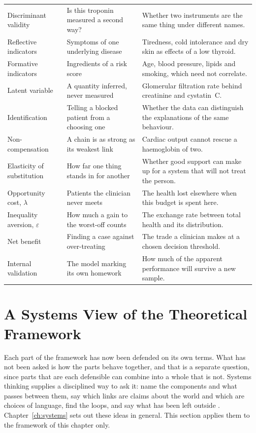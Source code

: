 {\begin{longtable}{p{3.3cm} p{3.9cm} p{6.2cm}}
\addlinespace
Discriminant validity & Is this troponin measured a second way? & Whether two instruments are the same thing under different names. \\
\addlinespace
Reflective indicators & Symptoms of one underlying disease & Tiredness, cold intolerance and dry skin as effects of a low thyroid. \\
\addlinespace
Formative indicators & Ingredients of a risk score & Age, blood pressure, lipids and smoking, which need not correlate. \\
\addlinespace
Latent variable & A quantity inferred, never measured & Glomerular filtration rate behind creatinine and cystatin~C. \\
\addlinespace
Identification & Telling a blocked patient from a choosing one & Whether the data can distinguish the explanations of the same behaviour. \\
\addlinespace
Non-compensation & A chain is as strong as its weakest link & Cardiac output cannot rescue a haemoglobin of two. \\
\addlinespace
Elasticity of substitution & How far one thing stands in for another & Whether good support can make up for a system that will not treat the person. \\
\addlinespace
Opportunity cost, $\lambda$ & Patients the clinician never meets & The health lost elsewhere when this budget is spent here. \\
\addlinespace
Inequality aversion, $\varepsilon$ & How much a gain to the worst-off counts & The exchange rate between total health and its distribution. \\
\addlinespace
Net benefit & Finding a case against over-treating & The trade a clinician makes at a chosen decision threshold. \\
\addlinespace
Internal validation & The model marking its own homework & How much of the apparent performance will survive a new sample. \\
\bottomrule
\end{longtable}
}

\section{A Systems View of the Theoretical Framework}
\label{sec:lit-systems}

Each part of the framework has now been defended on its own terms. What has not been asked is how the parts behave together, and that is a separate question, since parts that are each defensible can combine into a whole that is not. Systems thinking supplies a disciplined way to ask it: name the components and what passes between them, say which links are claims about the world and which are choices of language, find the loops, and say what has been left outside \citep{vonbertalanffy_1968,meadows_2008}. Chapter~\ref{ch:systems} sets out these ideas in general. This section applies them to the framework of this chapter only.

